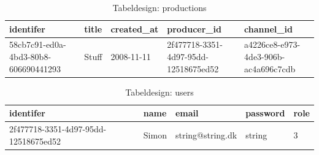 
\begin{table}[ht]
    \begin{tabularx}{\textwidth}{|X|X|X|X|X|}
        \hline
        \textbf{identifer} &  \textbf{title} & \textbf{created\_at} & \textbf{producer\_id} & \textbf{channel\_id}\\
        \hline
        58cb7c91-ed0a-4bd3-80b8-606690441293 & Stuff & 2008-11-11 & 2f477718-3351-4d97-95dd-12518675ed52 &  a4226ce8-e973-4de3-906b-ac4a696c7cdb\\
        \hline
    \end{tabularx}
    \caption{Tabeldesign: productions}
    \label{tab:productions_table}
\end{table}


\begin{table}[ht]
    \begin{tabularx}{\textwidth}{|X|X|X|X|X|}
        \hline
        \textbf{identifer} &  \textbf{name} & \textbf{email} & \textbf{password} & \textbf{role}\\
        \hline
        2f477718-3351-4d97-95dd-12518675ed52 & Simon & string@string.dk &  string & 3\\
        \hline
    \end{tabularx}
    \caption{Tabeldesign: users}
    \label{tab:users_table}
\end{table}


